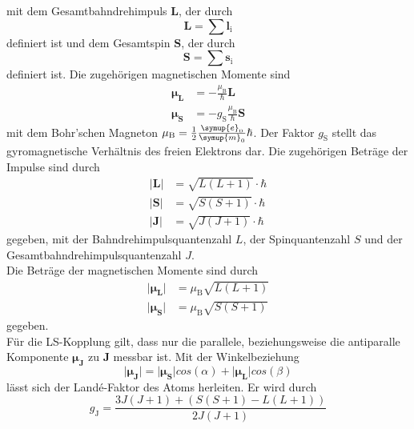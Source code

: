     mit dem Gesamtbahndrehimpuls $\symbf{L}$,
    der durch
    \begin{equation}
        \symbf{L} = \sum \symbf{l}_\text{i}
    \end{equation}
    definiert ist und dem Gesamtspin $\symbf{S}$,
    der durch
    \begin{equation}
        \symbf{S} = \sum \symbf{s}_\text{i} 
    \end{equation}
    definiert ist.
    Die zugehörigen magnetischen Momente sind
    \begin{align}
        \symbf{\mu_\text{L}} &= - \frac{\mu_\text{B}}{\hbar} \symbf{L} \\
        \symbf{\mu_\text{S}} &= - g_\text{S} \frac{\mu_\text{B}}{\hbar} \symbf{S} 
    \end{align}
    mit dem Bohr'schen Magneton $\mu_\text{B} = \frac{1}{2} \frac{\symup{e}_0}{\symup{m}_0} \hbar$.
    Der Faktor $g_\text{S}$ stellt das gyromagnetische Verhältnis des freien Elektrons dar.
    Die zugehörigen Beträge der Impulse sind durch
    \begin{align}
        \lvert \symbf{L} \rvert &= \sqrt{L(L+1)} \cdot \hbar \\
        \lvert \symbf{S} \rvert &= \sqrt{S(S+1)} \cdot \hbar \\
        \lvert \symbf{J} \rvert &= \sqrt{J(J+1)} \cdot \hbar 
    \end{align}
    gegeben,
    mit der Bahndrehimpulsquantenzahl $L$,
    der Spinquantenzahl $S$ und der Gesamtbahndrehimpulsquantenzahl $J$. \\
    Die Beträge der magnetischen Momente sind durch
    \begin{align}
        \lvert \symbf{\mu_\text{L}} \rvert &= \mu_\text{B} \sqrt{L(L+1)} \\
        \lvert \symbf{\mu_\text{S}} \rvert &= \mu_\text{B} \sqrt{S(S+1)}
    \end{align}
    gegeben. \\
    Für die LS-Kopplung gilt, 
    dass nur die parallele, 
    beziehungsweise die antiparalle Komponente $\symbf{\mu_\text{J}}$ zu $\symbf{J}$ messbar ist.
    Mit der Winkelbeziehung
    \begin{equation}
        \lvert \symbf{\mu_\text{J}} \rvert = \lvert \symbf{\mu_\text{S}} \rvert cos(\alpha) + \lvert \symbf{\mu_\text{L}} \rvert cos(\beta)
    \end{equation} 
    lässt sich der Landé-Faktor des Atoms herleiten. 
    Er wird durch 
    \begin{equation}
        g_\text{J} = \frac{3J(J+1) + (S(S+1) - L(L+1))}{2J(J+1)}
    \end{equation}
